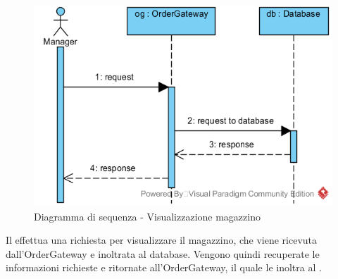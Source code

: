 \begin{figure}[H]
	\centering
	\includegraphics[width=14cm]{../../documenti/SpecificaTecnica/diagrammi_img/sequenza/direttore_visualizza_magazzino.png}
	\caption{Diagramma di sequenza - Visualizzazione magazzino}
\end{figure}
Il \Manager{} effettua una richiesta per visualizzare il magazzino, che viene ricevuta dall'Order\-Gateway e inoltrata al database. Vengono quindi recuperate le informazioni richieste e ritornate all'Order\-Gateway, il quale le inoltra al \Manager{}.

